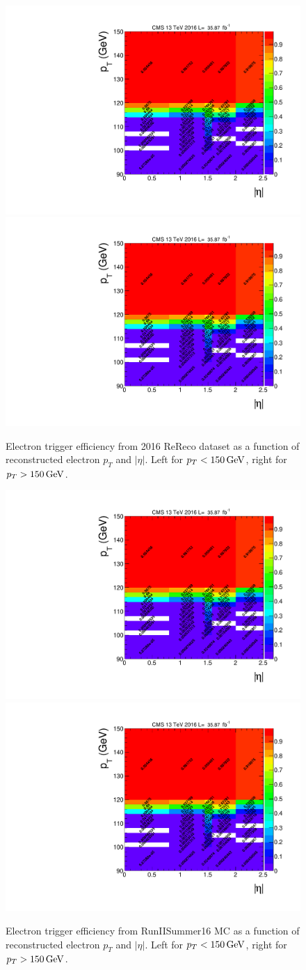 \begin{figure}[htpb]
\begin{center}
\includegraphics[width=0.49\linewidth, page=1]{figures/hlt115electron_2016fulleff_absetapt.pdf}
\includegraphics[width=0.49\linewidth, page=2]{figures/hlt115electron_2016fulleff_absetapt.pdf}
\caption{Electron trigger efficiency from 2016 ReReco dataset as a function of reconstructed electron $p_T$ and $|\eta|$. Left for $p_T <150\,\text{Ge\hspace{-.08em}V}$, right for $p_T >150\,\text{Ge\hspace{-.08em}V}$. }
\label{fig:trgeff_el_dt}
\end{center}
\end{figure}

\begin{figure}[htpb]
\begin{center}
\includegraphics[width=0.49\linewidth, page=3]{figures/hlt115electron_2016fulleff_absetapt.pdf}
\includegraphics[width=0.49\linewidth, page=4]{figures/hlt115electron_2016fulleff_absetapt.pdf}
\caption{Electron trigger efficiency from RunIISummer16 MC as a function of reconstructed electron $p_T$ and $|\eta|$. Left for $p_T <150\,\text{Ge\hspace{-.08em}V}$, right for $p_T >150\,\text{Ge\hspace{-.08em}V}$. }
\label{fig:trgeff_el_mc}
\end{center}
\end{figure}

